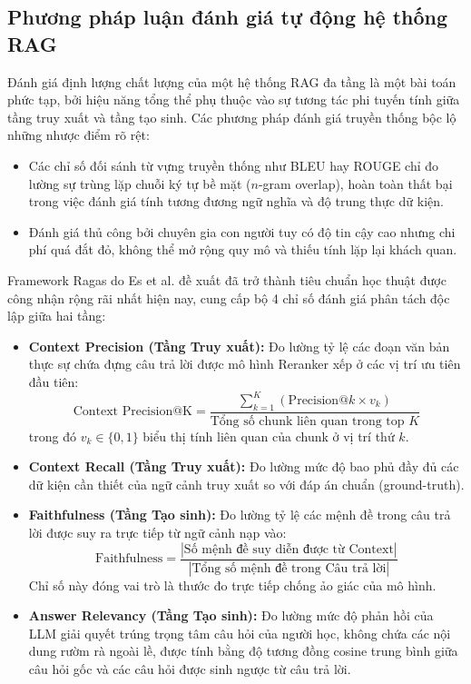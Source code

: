 ﻿\documentclass[12pt]{article}
\begin{document}
\subsection{Phương pháp luận đánh giá tự động hệ thống RAG}
Đánh giá định lượng chất lượng của một hệ thống RAG đa tầng là một bài toán phức tạp, bởi hiệu năng tổng thể phụ thuộc vào sự tương tác phi tuyến tính giữa tầng truy xuất và tầng tạo sinh. Các phương pháp đánh giá truyền thống bộc lộ những nhược điểm rõ rệt:
\begin{itemize}
    \item Các chỉ số đối sánh từ vựng truyền thống như BLEU hay ROUGE chỉ đo lường sự trùng lặp chuỗi ký tự bề mặt ($n$-gram overlap), hoàn toàn thất bại trong việc đánh giá tính tương đương ngữ nghĩa và độ trung thực dữ kiện.
    \item Đánh giá thủ công bởi chuyên gia con người tuy có độ tin cậy cao nhưng chi phí quá đắt đỏ, không thể mở rộng quy mô và thiếu tính lặp lại khách quan.
\end{itemize}

Framework Ragas do Es et al. \cite{es2023ragas} đề xuất đã trở thành tiêu chuẩn học thuật được công nhận rộng rãi nhất hiện nay, cung cấp bộ 4 chỉ số đánh giá phân tách độc lập giữa hai tầng:
\begin{itemize}
    \item \textbf{Context Precision (Tầng Truy xuất):} Đo lường tỷ lệ các đoạn văn bản thực sự chứa đựng câu trả lời được mô hình Reranker xếp ở các vị trí ưu tiên đầu tiên:
    \begin{equation}
        \text{Context Precision@K} = \frac{\sum_{k=1}^K (\text{Precision@}k \times v_k)}{\text{Tổng số chunk liên quan trong top } K}
    \end{equation}
    trong đó $v_k \in \{0, 1\}$ biểu thị tính liên quan của chunk ở vị trí thứ $k$.
    \item \textbf{Context Recall (Tầng Truy xuất):} Đo lường mức độ bao phủ đầy đủ các dữ kiện cần thiết của ngữ cảnh truy xuất so với đáp án chuẩn (ground-truth).
    \item \textbf{Faithfulness (Tầng Tạo sinh):} Đo lường tỷ lệ các mệnh đề trong câu trả lời được suy ra trực tiếp từ ngữ cảnh nạp vào:
    \begin{equation}
        \text{Faithfulness} = \frac{|\text{Số mệnh đề suy diễn được từ Context}|}{|\text{Tổng số mệnh đề trong Câu trả lời}|}
    \end{equation}
    Chỉ số này đóng vai trò là thước đo trực tiếp chống ảo giác của mô hình.
    \item \textbf{Answer Relevancy (Tầng Tạo sinh):} Đo lường mức độ phản hồi của LLM giải quyết trúng trọng tâm câu hỏi của người học, không chứa các nội dung rườm rà ngoài lề, được tính bằng độ tương đồng cosine trung bình giữa câu hỏi gốc và các câu hỏi được sinh ngược từ câu trả lời.
\end{itemize}
\end{document}
